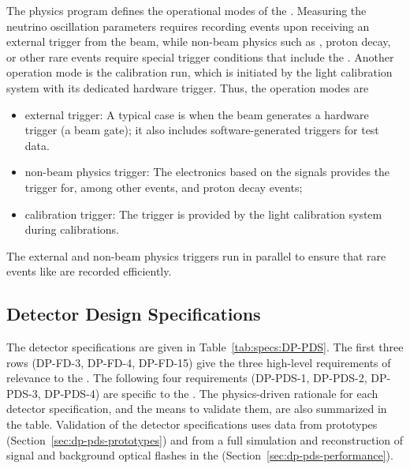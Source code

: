 The physics program defines the operational modes of the \dual {}. Measuring the neutrino oscillation parameters requires recording events upon receiving an external trigger from the beam, while non-beam physics such as , proton decay, or other rare events require special trigger conditions that include the . Another operation mode is the  calibration run, which is initiated by the light calibration system with its dedicated hardware trigger.
%
Thus, the operation modes are
\begin{itemize}
\item external trigger:  
A typical case is when the beam generates a hardware trigger (a beam gate);  it also includes software-generated triggers for test data.
\item non-beam physics trigger: The electronics based on the  signals provides the trigger for, among other events,  and proton decay events;
\item calibration trigger: The trigger is provided by the light calibration system during  calibrations.
\end{itemize}

The external and non-beam physics triggers run in parallel to ensure that rare events like  are recorded efficiently. 

\subsection{Detector Design Specifications}
\label{sec:dp-pds-overview_specs}

The \dual {} detector specifications are given in Table~\ref{tab:specs:DP-PDS}. The first three rows (DP-FD-3, DP-FD-4, DP-FD-15) give the three  high-level requirements of relevance to the . The following four requirements (DP-PDS-1, DP-PDS-2, DP-PDS-3, DP-PDS-4) are specific to the . The physics-driven rationale for each detector specification, and the means to validate them, are also summarized in the table. Validation of the detector specifications uses data from  prototypes (Section~\ref{sec:dp-pds-prototypes}) and from a full simulation and reconstruction of signal and background optical flashes in the \dpmod (Section~\ref{sec:dp-pds-performance}). 



